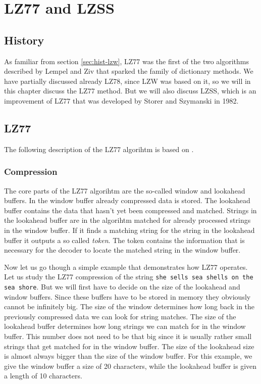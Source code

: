 \begin{comment}
  
\end{comment}

\chapter{LZ77 and LZSS}
\label{cha:lz77-lzss}

\section{History}

As familiar from section \ref{sec:hist-lzw}, LZ77 was the first of the
two algorithms described by Lempel and Ziv that sparked the family of
dictionary methods. We have partially discussed already LZ78, since
LZW was based on it, so we will in this chapter discuss the LZ77
method. But we will also discuss LZSS, which is an improvement of LZ77
that was developed by Storer and Szymanski in 1982.

\section{LZ77}

The following description of the LZ77 algorihtm is based on
\cite{Salomon:2004:DCC,mark1996data_compression_book,mcfadden92:_hackin_data_compr_ziv_lempel}.

\subsection{Compression}

The core parts of the LZ77 algorihtm are the so-called window and
lookahead buffers. In the window buffer already compressed data is
stored. The lookahead buffer contains the data that hasn't yet been
compressed and matched. Strings in the lookahead buffer are in the
algorihtm matched for already processed strings in the window
buffer. If it finds a matching string for the string in the lookahead
buffer it outputs a so called \textit{token}. The token contains the
information that is necessary for the decoder to locate the matched
string in the window buffer.

Now let us go though a simple example that demonstrates how LZ77
operates. Let us study the LZ77 compression of the string \texttt{she
  sells sea shells on the sea shore}. But we will first have to decide
on the size of the lookahead and window buffers. Since these buffers
have to be stored in memory they obviously cannot be infinitely
big. The size of the window determines how long back in the previously
compressed data we can look for string matches. The size of the
lookahead buffer determines how long strings we can match for in the
window buffer. This number does not need to be that big since it is
usually rather small strings that get matched for in the window
buffer. The size of the lookahead size is almost always bigger than
the size of the window buffer. For this example, we give the window
buffer a size of 20 characters, while the lookahead buffer is given a
length of 10 characters.


